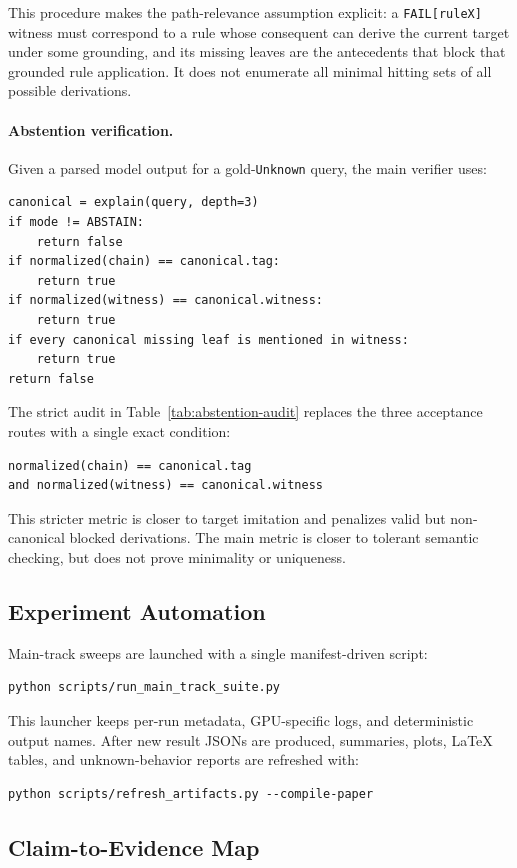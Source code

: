 This procedure makes the path-relevance assumption explicit: a
\texttt{FAIL[ruleX]} witness must correspond to a rule whose consequent can
derive the current target under some grounding, and its missing leaves are the
antecedents that block that grounded rule application. It does not enumerate all
minimal hitting sets of all possible derivations.

\paragraph{Abstention verification.}
Given a parsed model output for a gold-\texttt{Unknown} query, the main verifier
uses:
\begin{verbatim}
canonical = explain(query, depth=3)
if mode != ABSTAIN:
    return false
if normalized(chain) == canonical.tag:
    return true
if normalized(witness) == canonical.witness:
    return true
if every canonical missing leaf is mentioned in witness:
    return true
return false
\end{verbatim}
The strict audit in Table~\ref{tab:abstention-audit} replaces the three
acceptance routes with a single exact condition:
\begin{verbatim}
normalized(chain) == canonical.tag
and normalized(witness) == canonical.witness
\end{verbatim}
This stricter metric is closer to target imitation and penalizes valid but
non-canonical blocked derivations. The main metric is closer to tolerant
semantic checking, but does not prove minimality or uniqueness.

\subsection{Experiment Automation}

Main-track sweeps are launched with a single manifest-driven script:
\begin{verbatim}
python scripts/run_main_track_suite.py
\end{verbatim}
This launcher keeps per-run metadata, GPU-specific logs, and deterministic output names. After new result JSONs are produced, summaries, plots, LaTeX tables, and unknown-behavior reports are refreshed with:
\begin{verbatim}
python scripts/refresh_artifacts.py --compile-paper
\end{verbatim}

\subsection{Claim-to-Evidence Map}

